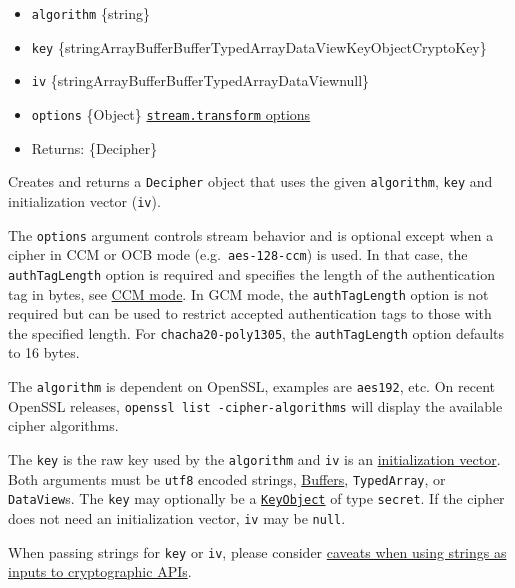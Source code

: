 \begin{itemize}
\tightlist
\item
  \texttt{algorithm} \{string\}
\item
  \texttt{key}
  \{string\textbar ArrayBuffer\textbar Buffer\textbar TypedArray\textbar DataView\textbar KeyObject\textbar CryptoKey\}
\item
  \texttt{iv}
  \{string\textbar ArrayBuffer\textbar Buffer\textbar TypedArray\textbar DataView\textbar null\}
\item
  \texttt{options} \{Object\}
  \href{stream.md\#new-streamtransformoptions}{\texttt{stream.transform}
  options}
\item
  Returns: \{Decipher\}
\end{itemize}

Creates and returns a \texttt{Decipher} object that uses the given
\texttt{algorithm}, \texttt{key} and initialization vector
(\texttt{iv}).

The \texttt{options} argument controls stream behavior and is optional
except when a cipher in CCM or OCB mode
(e.g.~\texttt{\textquotesingle{}aes-128-ccm\textquotesingle{}}) is used.
In that case, the \texttt{authTagLength} option is required and
specifies the length of the authentication tag in bytes, see
\hyperref[ccm-mode]{CCM mode}. In GCM mode, the \texttt{authTagLength}
option is not required but can be used to restrict accepted
authentication tags to those with the specified length. For
\texttt{chacha20-poly1305}, the \texttt{authTagLength} option defaults
to 16 bytes.

The \texttt{algorithm} is dependent on OpenSSL, examples are
\texttt{\textquotesingle{}aes192\textquotesingle{}}, etc. On recent
OpenSSL releases, \texttt{openssl\ list\ -cipher-algorithms} will
display the available cipher algorithms.

The \texttt{key} is the raw key used by the \texttt{algorithm} and
\texttt{iv} is an
\href{https://en.wikipedia.org/wiki/Initialization_vector}{initialization
vector}. Both arguments must be
\texttt{\textquotesingle{}utf8\textquotesingle{}} encoded strings,
\href{buffer.md}{Buffers}, \texttt{TypedArray}, or \texttt{DataView}s.
The \texttt{key} may optionally be a
\hyperref[class-keyobject]{\texttt{KeyObject}} of type \texttt{secret}.
If the cipher does not need an initialization vector, \texttt{iv} may be
\texttt{null}.

When passing strings for \texttt{key} or \texttt{iv}, please consider
\hyperref[using-strings-as-inputs-to-cryptographic-apis]{caveats when
using strings as inputs to cryptographic APIs}.

